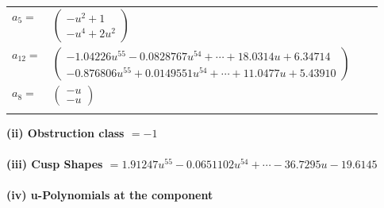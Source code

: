 \documentclass[1p]{elsarticle_modified}
\theoremstyle{definition}
\begin{document}
\begin{tabular}{m{7pt} m{180pt} m{7pt} m{180pt} }
\flushright $a_{5}=$&$\begin{pmatrix}- u^2+1\\- u^4+2 u^2\end{pmatrix}$ \\
\flushright $a_{12}=$&$\begin{pmatrix}-1.04226 u^{55}-0.0828767 u^{54}+\cdots+18.0314 u+6.34714\\-0.876806 u^{55}+0.0149551 u^{54}+\cdots+11.0477 u+5.43910\end{pmatrix}$ \\
\flushright $a_{8}=$&$\begin{pmatrix}- u\\- u\end{pmatrix}$\\&\end{tabular}
\flushleft \textbf{(ii) Obstruction class $= -1$}\\~\\
\flushleft \textbf{(iii) Cusp Shapes $= 1.91247 u^{55}-0.0651102 u^{54}+\cdots-36.7295 u-19.6145$}\\~\\
\newpage\renewcommand{\arraystretch}{1}
\flushleft \textbf{(iv) u-Polynomials at the component}\newline \\
\end{document}
